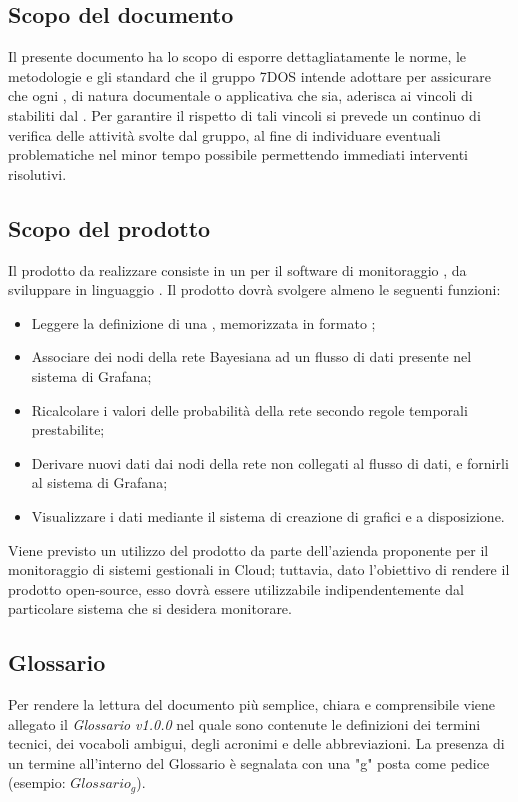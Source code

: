 \subsection{Scopo del documento}
Il presente documento ha lo scopo di esporre dettagliatamente le norme, le metodologie e gli standard che il gruppo 7DOS intende adottare per assicurare che ogni , di natura documentale o applicativa che sia, aderisca ai vincoli di  stabiliti dal . Per garantire il rispetto di tali vincoli si prevede un continuo  di verifica delle attività svolte dal gruppo, al fine di individuare eventuali problematiche nel minor tempo possibile permettendo immediati interventi risolutivi.
\subsection{Scopo del prodotto}
Il prodotto da realizzare consiste in un  per il software di monitoraggio , da sviluppare in linguaggio . Il prodotto dovrà svolgere almeno le seguenti funzioni:
\begin{itemize}
	\item{Leggere la definizione di una , memorizzata in formato ;}
	\item{Associare dei nodi della rete Bayesiana ad un flusso di dati presente nel sistema di Grafana;}
	\item{Ricalcolare i valori delle probabilità della rete secondo regole temporali prestabilite;}
	\item{Derivare nuovi dati dai nodi della rete non collegati al flusso di dati, e fornirli al sistema di Grafana;}
	\item{Visualizzare i dati mediante il sistema di creazione di grafici e  a disposizione.}
\end{itemize}
Viene previsto un utilizzo del prodotto da parte dell'azienda proponente per il monitoraggio di sistemi gestionali in Cloud; tuttavia, dato l'obiettivo di rendere il prodotto open-source, esso dovrà essere utilizzabile indipendentemente dal particolare sistema che si desidera monitorare.
\subsection{Glossario}
Per rendere la lettura del documento più semplice, chiara e comprensibile viene allegato il \emph{Glossario v1.0.0} nel quale sono contenute le definizioni dei termini tecnici, dei vocaboli ambigui, degli acronimi e delle abbreviazioni. La presenza di un termine all'interno del Glossario è segnalata con una "g" posta come pedice (esempio: $Glossario_{g}$).  
